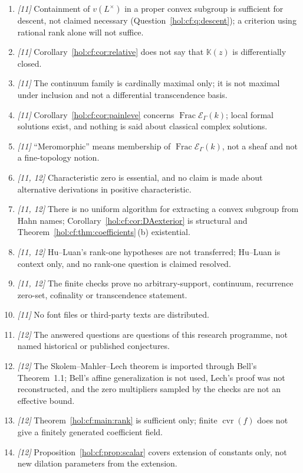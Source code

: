 \documentclass[11pt]{article}
\numberwithin{equation}{section}
\theoremstyle{definition}
\theoremstyle{remark}
\newcommand{\KK}{\mathbb K}
\newcommand{\EK}{\mathcal E_\Gamma(k)}
\newcommand{\FE}{\operatorname{Frac}\EK}
\newcommand{\cvr}{\operatorname{cvr}}
\begin{document}
\begin{enumerate}[label=\textup{(C\arabic*)}]
values.
\item \emph{[11]} Containment of $v(L^\times)$ in a proper convex subgroup is
sufficient for descent, not claimed necessary
(Question~\ref{hol:cf:q:descent}); a criterion using rational rank alone will
not suffice.
\item \emph{[11]} Corollary~\ref{hol:cf:cor:relative} does not say that
$\KK(z)$ is differentially closed.
\item \emph{[11]} The continuum family is cardinally maximal only; it is not
maximal under inclusion and not a differential transcendence basis.
\item \emph{[11]} Corollary~\ref{hol:cf:cor:painleve} concerns $\FE$; local
formal solutions exist, and nothing is said about classical complex
solutions.
\item \emph{[11]} ``Meromorphic'' means membership of $\FE$, not a sheaf and
not a fine-topology notion.
\item \emph{[11, 12]} Characteristic zero is essential, and no claim is made
about alternative derivations in positive characteristic.
\item \emph{[11, 12]} There is no uniform algorithm for extracting a convex
subgroup from Hahn names; Corollary~\ref{hol:cf:cor:DAexterior} is structural
and Theorem~\ref{hol:cf:thm:coefficients}\,(b) existential.
\item \emph{[11, 12]} Hu--Luan's rank-one hypotheses are not transferred;
Hu--Luan is context only, and no rank-one question is claimed resolved.
\item \emph{[11, 12]} The finite checks prove no arbitrary-support,
continuum, recurrence zero-set, cofinality or transcendence statement.
\item \emph{[11]} No font files or third-party texts are distributed.
\item \emph{[12]} The answered questions are questions of this research
programme, not named historical or published conjectures.
\item \emph{[12]} The Skolem--Mahler--Lech theorem is imported through Bell's
Theorem~1.1; Bell's affine generalization is not used, Lech's proof was not
reconstructed, and the zero multipliers sampled by the checks are not an
effective bound.
\item \emph{[12]} Theorem~\ref{hol:cf:main:rank} is sufficient only; finite
$\cvr(f)$ does not give a finitely generated coefficient field.
\item \emph{[12]} Proposition~\ref{hol:cf:prop:scalar} covers extension of
constants only, not new dilation parameters from the extension.

\end{enumerate}
\end{document}
